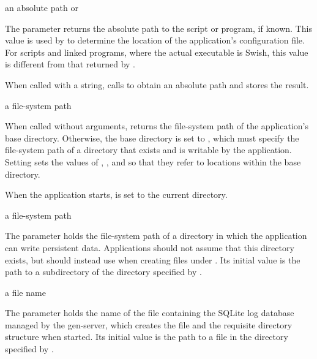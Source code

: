 \begin{parameter}
\end{parameter}
\hasvalue{} an absolute path or 

The  parameter returns the absolute path to the script or
program, if known.
This value is used by  to determine the
location of the application's configuration file.
For scripts and linked programs, where the actual executable is Swish, this
value is different from that returned by .

When called with a string,  calls  to
obtain an absolute path and stores the result.

\begin{parameter}
\end{parameter}
\hasvalue{} a file-system path

When called without arguments,  returns the file-system
path of the application's base directory.  Otherwise, the base
directory is set to , which must specify the file-system
path of a directory that exists and is writable by the application.
Setting  sets the values of ,
, and  so that they refer to locations
within the base directory.

When the application starts,  is set to the current directory.

\begin{parameter}
\end{parameter}
\hasvalue{} a file-system path

The  parameter holds the file-system path of a directory
in which the application can write persistent data.
Applications should not assume that this directory exists, but should
instead use  when creating files under .
Its initial value is the path to a  subdirectory of
the directory specified by .

\begin{parameter}
\end{parameter}
\hasvalue{} a file name

The  parameter holds the name of the file containing the SQLite
log database managed by the  gen-server, which creates the file
and the requisite directory structure when started.
Its initial value is the path to a  file in the directory
specified by .

